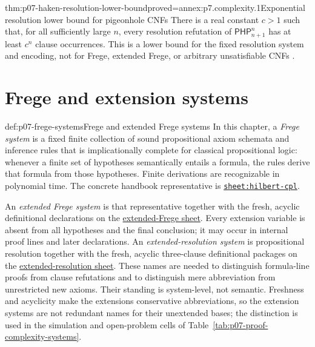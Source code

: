 \begin{hbtheorem}{thm:p07-haken-resolution-lower-bound}{proved=annex:p7.complexity.1}{Exponential resolution lower bound for pigeonhole CNFs}
There is a real constant \(c>1\) such that, for all sufficiently large
\(n\), every resolution refutation of
\(\mathsf{PHP}^{n}_{n+1}\) has at least \(c^n\) clause occurrences.  This is
a lower bound for the fixed resolution system and encoding, not for Frege,
extended Frege, or arbitrary unsatisfiable CNFs
\cite{Haken1985,BeamePitassi1998}.
\end{hbtheorem}

\section{Frege and extension systems}
\label{sec:p07-frege-systems}

\begin{hbdefinition}{def:p07-frege-systems}{Frege and extended Frege systems}
In this chapter, a \emph{Frege system} is a fixed finite collection of sound
propositional axiom schemata and inference rules that is implicationally
complete for classical propositional logic: whenever a finite set of
hypotheses semantically entails a formula, the rules derive that formula
from those hypotheses. Finite derivations are recognizable in polynomial
time. The concrete handbook representative is
\hyperref[sheet:hilbert-cpl]{\texttt{sheet:hilbert-cpl}}.

An \emph{extended Frege system} is that representative together with the
fresh, acyclic definitional declarations on the
\hyperref[sheet:extended-frege-cpl]{extended-Frege sheet}.
Every extension variable is absent from all hypotheses and the final
conclusion; it may occur in internal proof lines and later declarations.
An \emph{extended-resolution system} is propositional resolution together
with the fresh, acyclic three-clause definitional packages on
the \hyperref[sheet:extended-resolution-cpl]{extended-resolution sheet}.
These names are needed to distinguish formula-line proofs from clause
refutations and to distinguish mere abbreviation from unrestricted new
axioms.  Their standing is system-level, not semantic.  Freshness and
acyclicity make the extensions conservative abbreviations, so the extension
systems are not redundant names for their unextended bases; the distinction
is used in the simulation and open-problem cells of
Table~\ref{tab:p07-proof-complexity-systems}.
\end{hbdefinition}

